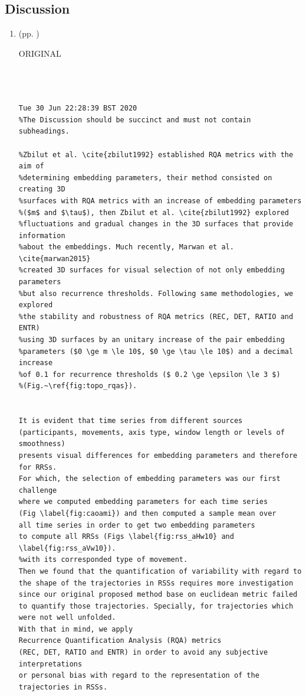 \documentclass[10pt]{article}
\begin{document}
\subsection{Discussion}
\begin{enumerate}



\item  (pp. ) 

ORIGINAL
\begin{verbatim}



Tue 30 Jun 22:28:39 BST 2020 
%The Discussion should be succinct and must not contain subheadings.

%Zbilut et al. \cite{zbilut1992} established RQA metrics with the aim of 
%determining embedding parameters, their method consisted on creating 3D 
%surfaces with RQA metrics with an increase of embedding parameters 
%($m$ and $\tau$), then Zbilut et al. \cite{zbilut1992} explored 
%fluctuations and gradual changes in the 3D surfaces that provide information 
%about the embeddings. Much recently, Marwan et al. \cite{marwan2015} 
%created 3D surfaces for visual selection of not only embedding parameters 
%but also recurrence thresholds. Following same methodologies, we explored 
%the stability and robustness of RQA metrics (REC, DET, RATIO and ENTR)
%using 3D surfaces by an unitary increase of the pair embedding 
%parameters ($0 \ge m \le 10$, $0 \ge \tau \le 10$) and a decimal increase 
%of 0.1 for recurrence thresholds ($ 0.2 \ge \epsilon \le 3 $) 
%(Fig.~\ref{fig:topo_rqas}).


It is evident that time series from different sources 
(participants, movements, axis type, window length or levels of smoothness) 
presents visual differences for embedding parameters and therefore for RRSs. 
For which, the selection of embedding parameters was our first challenge 
where we computed embedding parameters for each time series 
(Fig \label{fig:caoami}) and then computed a sample mean over 
all time series in order to get two embedding parameters 
to compute all RRSs (Figs \label{fig:rss_aHw10} and \label{fig:rss_aVw10}). 
%with its corresponded type of movement. 
Then we found that the quantification of variability with regard to 
the shape of the trajectories in RSSs requires more investigation 
since our original proposed method base on euclidean metric failed 
to quantify those trajectories. Specially, for trajectories which 
were not well unfolded. 
With that in mind, we apply 
Recurrence Quantification Analysis (RQA) metrics 
(REC, DET, RATIO and ENTR) in order to avoid any subjective interpretations 
or personal bias with regard to the representation of the trajectories in RSSs.



\end{verbatim}
\end{enumerate}
\end{document}
